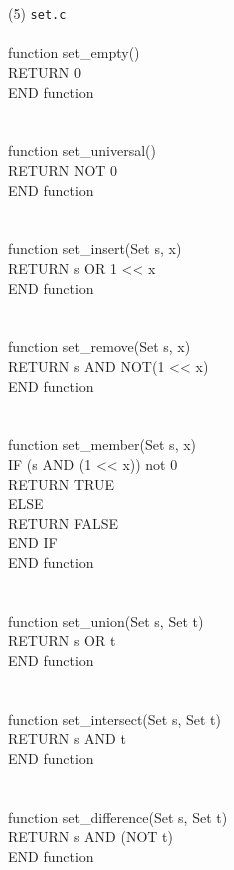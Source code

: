 \documentclass[12pt]{article}
\begin{document}
\\
\\
(5) \texttt{set.c} \\
\\
function set\_empty() \\
\indent RETURN 0 \\
END function \\
\\
\\
function set\_universal() \\
\indent RETURN NOT 0 \\
END function \\
\\
\\
function set\_insert(Set s, x) \\
\indent RETURN s OR 1 << x \\
END function \\
\\
\\
function set\_remove(Set s, x) \\
\indent RETURN s AND NOT(1 << x) \\
END function \\
\\
\\
function set\_member(Set s, x) \\
\indent IF (s AND (1 << x)) not 0 \\
\indent \indent RETURN TRUE \\
\indent ELSE \\
\indent \indent RETURN FALSE \\
\indent END IF \\
END function \\
\\
\\
function set\_union(Set s, Set t) \\
\indent RETURN s OR t \\
END function \\
\\
\\
function set\_intersect(Set s, Set t) \\
\indent RETURN s AND t \\
END function \\
\\
\\
function set\_difference(Set s, Set t) \\
\indent RETURN s AND (NOT t) \\
END function \\
\end{document}
